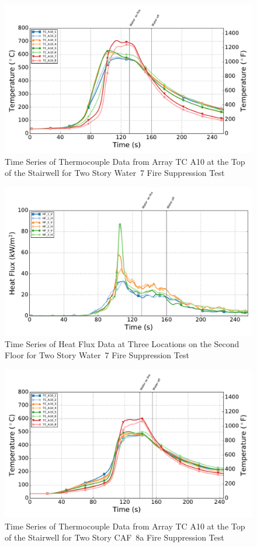 \documentclass[12pt,oneside]{book}
\begin{document}
\begin{figure}[!ht]
	\includegraphics[width=.85\columnwidth]{../Figures/Script_Figures/Test_39_West_061315_TC_A10}
	\caption{Time Series of Thermocouple Data from Array TC A10 at the Top of the Stairwell for Two Story Water~7 Fire Suppression Test}
	\label{fig:app_water7_tca10}
\end{figure}

\begin{figure}[!ht]
	\includegraphics[width=.85\columnwidth]{../Figures/Script_Figures/Test_39_West_061315_Heat_Flux}
	\caption{Time Series of Heat Flux Data at Three Locations on the Second Floor for Two Story Water~7 Fire Suppression Test}
	\label{fig:app_water7_hf}
\end{figure}

\begin{figure}[!ht]
	\includegraphics[width=.85\columnwidth]{../Figures/Script_Figures/Test_40a_West_061415_TC_A10}
	\caption{Time Series of Thermocouple Data from Array TC A10 at the Top of the Stairwell for Two Story CAF~8a Fire Suppression Test}
	\label{fig:app_caf8a_tca10}
\end{figure}
\end{document}
